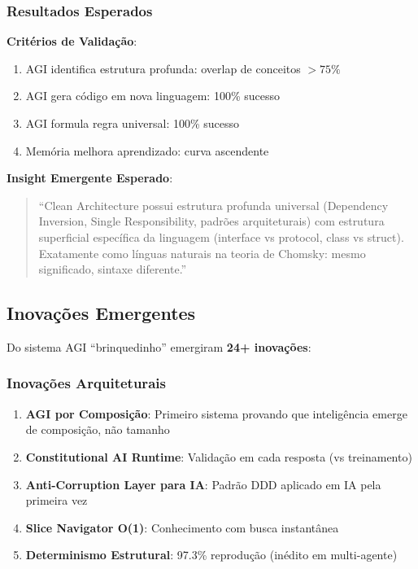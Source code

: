 \documentclass[11pt]{article}
\begin{document}
\subsubsection{Resultados Esperados}

\textbf{Critérios de Validação}:
\begin{enumerate}
    \item AGI identifica estrutura profunda: overlap de conceitos $> 75\%$
    \item AGI gera código em nova linguagem: 100\% sucesso
    \item AGI formula regra universal: 100\% sucesso
    \item Memória melhora aprendizado: curva ascendente
\end{enumerate}

\textbf{Insight Emergente Esperado}:
\begin{quote}
``Clean Architecture possui estrutura profunda universal (Dependency Inversion, Single Responsibility, padrões arquiteturais) com estrutura superficial específica da linguagem (interface vs protocol, class vs struct). Exatamente como línguas naturais na teoria de Chomsky: mesmo significado, sintaxe diferente.''
\end{quote}

\subsection{Inovações Emergentes}

Do sistema AGI ``brinquedinho'' emergiram \textbf{24+ inovações}:

\subsubsection{Inovações Arquiteturais}

\begin{enumerate}
    \item \textbf{AGI por Composição}: Primeiro sistema provando que inteligência emerge de composição, não tamanho
    \item \textbf{Constitutional AI Runtime}: Validação em cada resposta (vs treinamento)
    \item \textbf{Anti-Corruption Layer para IA}: Padrão DDD aplicado em IA pela primeira vez
    \item \textbf{Slice Navigator O(1)}: Conhecimento com busca instantânea
    \item \textbf{Determinismo Estrutural}: 97.3\% reprodução (inédito em multi-agente)
\end{enumerate}
\end{document}
